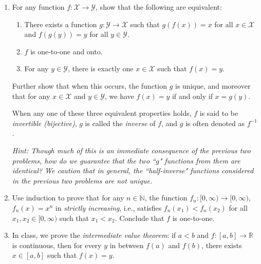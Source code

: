 \documentclass[12 pt,letterpaper]{article}
\newcommand{\bbN}{\mathbb{N}}
\newcommand{\bbR}{\mathbb{R}}
\newcommand{\calX}{\mathcal{X}}
\newcommand{\calY}{\mathcal{Y}}
\newcommand{\romanii}{\renewcommand{\labelenumii}{(\roman{enumii})}}
\begin{document}
\begin{enumerate}
\begin{enumerate}
\end{enumerate}

When any one of these three equivalent properties holds,
$f$ is said to be \textit{one-to-one (injective)}.

\item
For any function $f:\calX\rightarrow\calY$,
show that the following are equivalent:

\begin{enumerate}
\romanii

\item
There exists a function $g:\calY\rightarrow\calX$ such that $g(f(x))=x$ for all $x\in\calX$ and $f(g(y))=y$ for all $y\in\calY$.

\item
$f$ is one-to-one and onto.

\item
For any $y\in\calY$, there is exactly one $x\in\calX$ such that $f(x)=y$.

\end{enumerate}

Further show that when this occurs, the function $g$ is unique,
and moreover that for any $x\in\calX$ and $y\in\calY$,
we have $f(x)=y$ if and only if $x=g(y)$.

When any one of these three equivalent properties holds,
$f$ is said to be \textit{invertible (bijective)},
$g$ is called the \textit{inverse} of $f$,
and $g$ is often denoted as $f^{-1}$.

\textit{Hint:
Though much of this is an immediate consequence of the previous two problems,
how do we guarantee that the two ``$g$" functions from them are identical?
We caution that in general, the ``half-inverse" functions considered in the previous two problems are not unique.}

\newpage

\item
Use induction to prove that for any $n\in\bbN$,
the function $f_n:[0,\infty)\rightarrow[0,\infty)$, $f_n(x)=x^n$ in \textit{strictly increasing}, i.e., satisfies $f_n(x_1)<f_n(x_2)$ for all $x_1,x_2\in[0,\infty)$ such that $x_1<x_2$.
Conclude that $f$ is one-to-one.

\item
In class, we prove the \textit{intermediate value theorem}:
if $a<b$ and $f:[a,b]\rightarrow\bbR$ is continuous,
then for every $y$ in between $f(a)$ and $f(b)$,
there exists $x\in[a,b]$ such that $f(x)=y$.


\end{enumerate}
\end{document}

